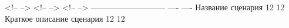 \markdownRendererDocumentBegin
\markdownRendererPipe{} <!-- --> \markdownRendererPipe{} <!-- --> \markdownRendererPipe{} <!-- --> \markdownRendererPipe{} \markdownRendererPipe{} --------------------------- \markdownRendererPipe{} ---- \markdownRendererPipe{} ---- \markdownRendererPipe{} \markdownRendererPipe{} Название сценария \markdownRendererPipe{} 12\markdownRendererPipe{} 12 \markdownRendererPipe{} \markdownRendererPipe{} Краткое описание сценария \markdownRendererPipe{} 12 \markdownRendererPipe{} 12 \markdownRendererPipe{}\markdownRendererDocumentEnd